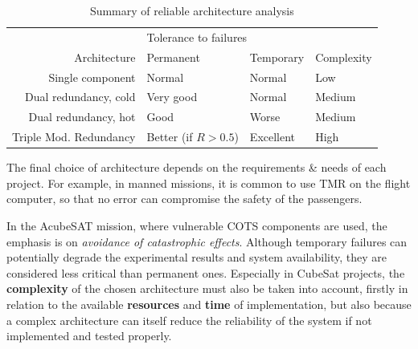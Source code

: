 \documentclass[a4paper,nobib,final]{tufte-book}
\begin{document}
\begin{table}[h]
	\caption{Summary of reliable architecture analysis}
	\label{tab:calcuresults}
	\begin{adjustbox}{center}
	\begin{tabular}{@{}rlll@{}}
		\toprule
		& \multicolumn{2}{l}{Tolerance to failures} & \\ \cmidrule{2-3}
		Architecture & Permanent & Temporary & Complexity \\ \midrule
		Single component & \color{MaterialGrey800} Normal & \color{MaterialGrey800} Normal & \color{MaterialGreen600} Low \\
		Dual redundancy, cold & \color{MaterialGreenA700} Very good & \color{MaterialGrey800} Normal & \color{MaterialOrange900} Medium\\
		Dual redundancy, hot & \color{MaterialGreen600} Good & \color{MaterialOrange900} Worse & \color{MaterialOrange900} Medium\\
		Triple Mod. Redundancy & \color{MaterialLime800} Better {\footnotesize(if \(R > 0.5\))} & \color{MaterialGreenA700} Excellent & \color{MaterialRed800} High \\ \bottomrule
	\end{tabular}
	\end{adjustbox}
\end{table}



The final choice of architecture depends on the requirements \& needs of each project. For example, in manned missions, it is common to use \acs{TMR} on the flight computer, so that no error can compromise the safety of the passengers.

In the AcubeSAT mission, where vulnerable \acs{COTS} components are used, the emphasis is on \emph{avoidance of catastrophic effects}. Although temporary failures can potentially degrade the experimental results and system availability, they are considered less critical than permanent ones. Especially in CubeSat projects, the \textbf{complexity} of the chosen architecture must also be taken into account, firstly in relation to the available \textbf{resources} and \textbf{time} of implementation, but also because a complex architecture can itself reduce the reliability of the system if not implemented and tested properly.
\end{document}
